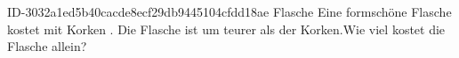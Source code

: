 \begin{exercise}
      {ID-3032a1ed5b40cacde8ecf29db9445104cfdd18ae}
      {Flasche}
  \ifproblem\problem
    Eine formschöne Flasche kostet mit Korken . Die Flasche ist um
     teurer als der Korken.Wie viel kostet die Flasche allein?
  \fi
\end{exercise}
